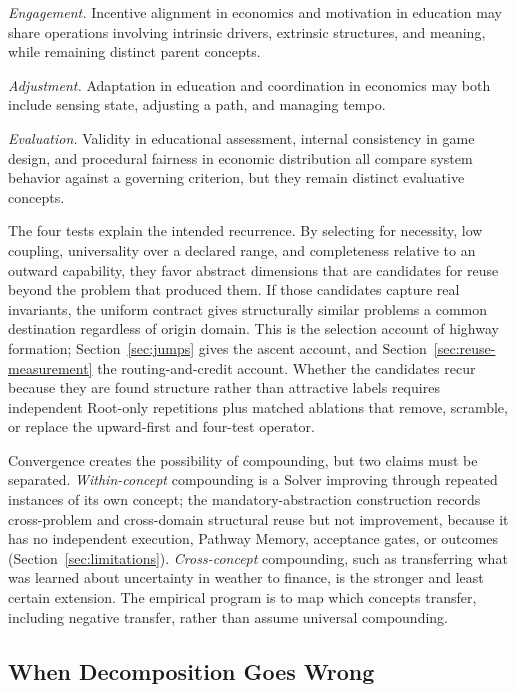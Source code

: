 \documentclass[11pt]{article}
\begin{document}
\emph{Engagement.} Incentive alignment in economics and motivation in education may share operations involving intrinsic drivers, extrinsic structures, and meaning, while remaining distinct parent concepts.

\emph{Adjustment.} Adaptation in education and coordination in economics may both include sensing state, adjusting a path, and managing tempo.

\emph{Evaluation.} Validity in educational assessment, internal consistency in game design, and procedural fairness in economic distribution all compare system behavior against a governing criterion, but they remain distinct evaluative concepts.

The four tests explain the intended recurrence. By selecting for necessity, low coupling, universality over a declared range, and completeness relative to an outward capability, they favor abstract dimensions that are candidates for reuse beyond the problem that produced them. If those candidates capture real invariants, the uniform contract gives structurally similar problems a common destination regardless of origin domain. This is the selection account of highway formation; Section~\ref{sec:jumps} gives the ascent account, and Section~\ref{sec:reuse-measurement} the routing-and-credit account. Whether the candidates recur because they are found structure rather than attractive labels requires independent Root-only repetitions plus matched ablations that remove, scramble, or replace the upward-first and four-test operator.

Convergence creates the possibility of compounding, but two claims must be separated. \emph{Within-concept} compounding is a Solver improving through repeated instances of its own concept; the mandatory-abstraction construction records cross-problem and cross-domain structural reuse but not improvement, because it has no independent execution, Pathway Memory, acceptance gates, or outcomes (Section~\ref{sec:limitations}). \emph{Cross-concept} compounding, such as transferring what was learned about uncertainty in weather to finance, is the stronger and least certain extension. The empirical program is to map which concepts transfer, including negative transfer, rather than assume universal compounding.

\subsection{When Decomposition Goes Wrong}
\label{sec:decomposition-failures}
\end{document}
